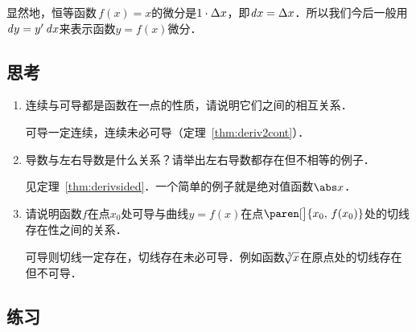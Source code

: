 \begin{remark}
  显然地，恒等函数\(\,f(x) = x\)的微分是\(1 \cdot \mathop{}\!\Delta x\)，即\(\mathop{}\!\mathit{d} x = \mathop{}\!\Delta x\)．所以我们今后一般用\(\mathop{}\!\mathit{d} y = y' \mathop{}\!\mathit{d} x\)来表示函数\(y = f(x)\)微分．
\end{remark}


\subsection*{思考}

\begin{enumerate}
\item 连续与可导都是函数在一点的性质，请说明它们之间的相互关系．

  \ifshowsolp
    可导一定连续，连续未必可导（定理~\ref{thm:deriv2cont}）．
  \fi

\item 导数与左右导数是什么关系？请举出左右导数都存在但不相等的例子．

  \ifshowsolp
    见定理~\ref{thm:derivsided}．一个简单的例子就是绝对值函数\(\abs x\)．
  \fi

\item 请说明函数\(f\)在点\(x_0\)处可导与曲线\(y = f(x)\)在点\(\paren[\big]{x_0, \,f(x_0)}\)处的切线存在性之间的关系．

  \ifshowsolp
    可导则切线一定存在，切线存在未必可导．例如函数\(\!\sqrt[\leftroot{-2}\uproot{2}3] x\)在原点处的切线存在但不可导．
  \fi
\end{enumerate}

\ifshowex
{}
\subsection*{练习}
\label{B1.4.1.E}

